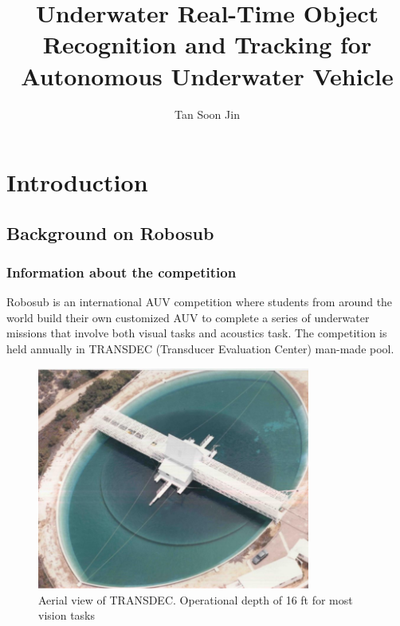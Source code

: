 \documentclass[fypca]{socreport}
\begin{document}
\title{Underwater Real-Time Object Recognition and Tracking for Autonomous Underwater Vehicle}
\author{Tan Soon Jin}

\maketitle



\listoffigures
\listoftables


\chapter{Introduction}

\section{Background on Robosub}

\subsection{Information about the competition}
Robosub is an international AUV competition where students from around
the world build their own customized AUV to complete a series of
underwater missions that involve both visual tasks and acoustics task.
The competition is held annually in TRANSDEC (Transducer Evaluation
Center) man-made pool.

\begin{figure}[ht]
\centering

        \includegraphics[width=0.8\textwidth, height=0.3\textheight]{transdec_aerial.png}
        \caption{Aerial view of TRANSDEC. Operational depth of 16 ft for most vision tasks}
        \label{fig:transdec_aerial}

\end{figure}
\end{document}
